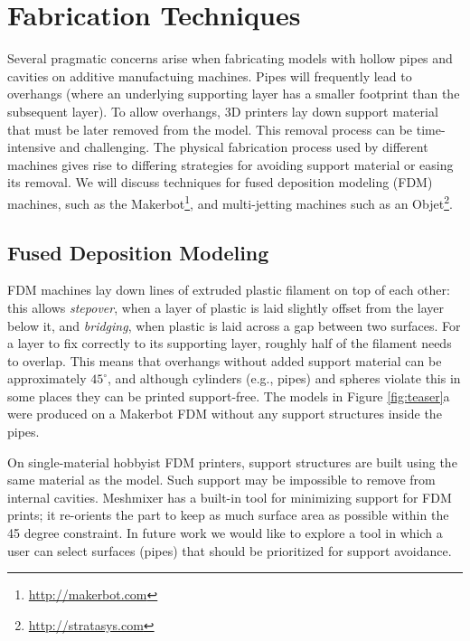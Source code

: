 \section{Fabrication Techniques}
Several pragmatic concerns arise when fabricating models with hollow pipes and cavities on additive manufactuing machines. Pipes will frequently lead to overhangs (where an underlying supporting layer has a smaller footprint than the subsequent layer).
To allow overhangs, 3D printers lay down support material that must be later removed from the model.  This removal process can be time-intensive and challenging.  The physical fabrication process used by different machines gives rise to differing strategies for avoiding support material or easing its removal.  We will discuss techniques for fused deposition modeling (FDM) machines, such as the Makerbot\footnote{\url{http://makerbot.com}}, and multi-jetting machines such as an Objet\footnote{\url{http://stratasys.com}}.

\subsection{Fused Deposition Modeling}
FDM machines lay down lines of extruded plastic filament on top of each other: this allows {\em stepover}, when a layer of plastic is laid slightly offset from the layer below it, and {\em bridging}, when plastic is laid across a gap between two surfaces.  For a layer to fix correctly to its supporting layer, roughly half of the filament needs to overlap.  This means that overhangs without added support material can be approximately $45^{\circ}$, and although cylinders (e.g., pipes) and spheres violate this in some places they can be printed support-free. The models in Figure \ref{fig:teaser}a were produced on a Makerbot FDM without any support structures inside the pipes.

On single-material hobbyist FDM printers, support structures are built using the same material as the model. Such support may be impossible to remove from internal cavities.  Meshmixer has a built-in tool for minimizing support for FDM prints; it re-orients the part to keep as much surface area as possible within the 45 degree constraint.  In future work we would like to explore a tool in which a user can select surfaces (pipes) that should be prioritized for support avoidance.

